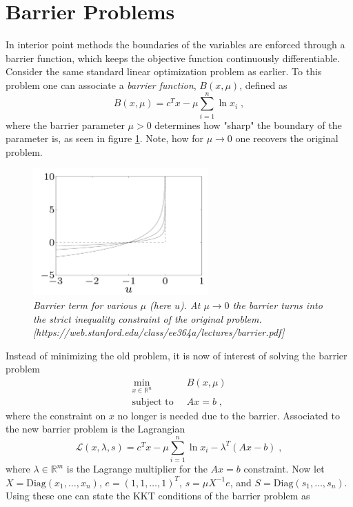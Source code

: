 \section{Barrier Problems}
In interior point methods the boundaries of the variables are enforced through a barrier function, which keeps the objective function continuously differentiable.
Consider the same standard linear optimization problem as earlier. To this problem one can associate a \textit{barrier function}, $B(x , \mu)$, defined as
\begin{equation}
	B(x , \mu) = c^T x - \mu \sum_{i=1}^{n} \ln x_i \; ,
\end{equation} 
where the barrier parameter $\mu > 0$ determines how "sharp" the boundary of the parameter is, as seen in figure \ref{fig:barrier}. Note, how for $\mu \to 0$ one recovers the original problem.
\begin{figure}[h!]
	\centering
	\includegraphics[width=0.6\textwidth]{Figures/barrier.png}
	\caption{\textit{Barrier term for various $\mu$ (here $u$). At $\mu \to 0$ the barrier turns into the strict inequality constraint of the original problem. [https://web.stanford.edu/class/ee364a/lectures/barrier.pdf]}}
	\label{fig:barrier}
\end{figure}
Instead of minimizing the old problem, it is now of interest of solving the barrier problem 
\begin{align*}
	\min_{x \in \mathbb{R}^n} \;  & \; B(x , \mu) \\
	\text{subject to} \;  & \; A x = b   \; ,
\end{align*}
where the constraint on $x$ no longer is needed due to the barrier. Associated to the new barrier problem is the Lagrangian
\begin{equation}
	\mathcal{L}(x, \lambda, s) = c^T x - \mu \sum_{i=1}^{n} \ln x_i - \lambda^T (A x -b) \; ,
\end{equation}
where $\lambda \in \mathbb{R}^m$ is the Lagrange multiplier for the $A x = b$ constraint. Now let $X = \mathrm{Diag}(x_1 , \ldots , x_n)$, $e = (1,1, \ldots , 1)^T$, $s = \mu X^{-1} e$, and $S = \mathrm{Diag}(s_1 , \ldots , s_n)$. Using these one can state the KKT conditions of the barrier problem as 
